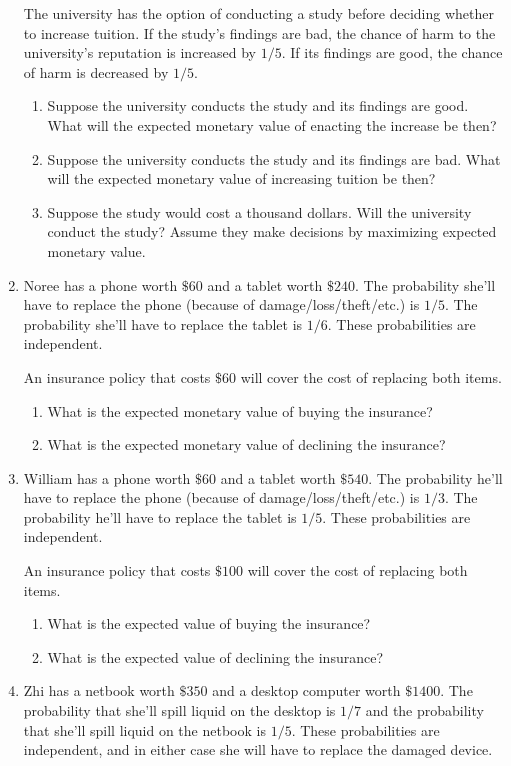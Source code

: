 \documentclass[justified]{tufte-book}
\providecommand{\tightlist}{%
  \setlength{\itemsep}{0pt}\setlength{\parskip}{0pt}}
\theoremstyle{definition}
\theoremstyle{definition}
\theoremstyle{definition}
\theoremstyle{remark}
\begin{document}
\begin{enumerate}
  The university has the option of conducting a study before deciding
  whether to increase tuition. If the study's findings are bad, the
  chance of harm to the university's reputation is increased by \(1/5\).
  If its findings are good, the chance of harm is decreased by \(1/5\).

  \begin{enumerate}
  \def\labelenumii{\alph{enumii}.}
  \setcounter{enumii}{1}
  \tightlist
  \item
    Suppose the university conducts the study and its findings are good.
    What will the expected monetary value of enacting the increase be
    then?
  \item
    Suppose the university conducts the study and its findings are bad.
    What will the expected monetary value of increasing tuition be then?
  \item
    Suppose the study would cost a thousand dollars. Will the university
    conduct the study? Assume they make decisions by maximizing expected
    monetary value.
  \end{enumerate}
\item
  Noree has a phone worth \(\$60\) and a tablet worth \(\$240\). The
  probability she'll have to replace the phone (because of
  damage/loss/theft/etc.) is \(1/5\). The probability she'll have to
  replace the tablet is \(1/6\). These probabilities are independent.

  An insurance policy that costs \(\$60\) will cover the cost of
  replacing both items.

  \begin{enumerate}
  \def\labelenumii{\alph{enumii}.}
  \tightlist
  \item
    What is the expected monetary value of buying the insurance?
  \item
    What is the expected monetary value of declining the insurance?
  \end{enumerate}
\item
  William has a phone worth \(\$60\) and a tablet worth \(\$540\). The
  probability he'll have to replace the phone (because of
  damage/loss/theft/etc.) is \(1/3\). The probability he'll have to
  replace the tablet is \(1/5\). These probabilities are independent.

  An insurance policy that costs \(\$100\) will cover the cost of
  replacing both items.

  \begin{enumerate}
  \def\labelenumii{\alph{enumii}.}
  \tightlist
  \item
    What is the expected value of buying the insurance?
  \item
    What is the expected value of declining the insurance?
  \end{enumerate}
\item
  Zhi has a netbook worth \(\$350\) and a desktop computer worth
  \(\$1400\). The probability that she'll spill liquid on the desktop is
  \(1/7\) and the probability that she'll spill liquid on the netbook is
  \(1/5\). These probabilities are independent, and in either case she
  will have to replace the damaged device.


\end{enumerate}
\end{document}
